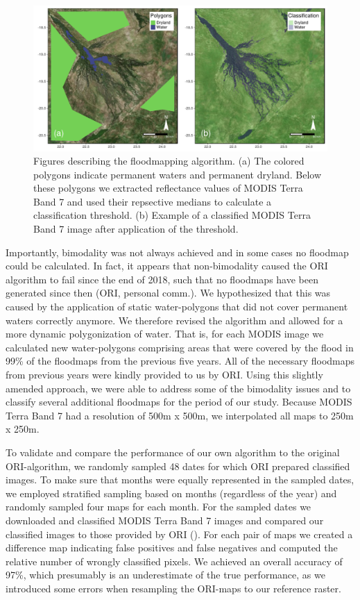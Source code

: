 \documentclass[abstract=on,10pt,a4paper,bibliography=totocnumbered]{scrartcl}
\begin{document}
\begin{figure}[h]
  \begin{center}
    \includegraphics[width = \textwidth]{99_Floodmapping.pdf}
    \caption{Figures describing the floodmapping algorithm. (a) The colored
    polygons indicate permanent waters and permanent dryland. Below these
    polygons we extracted reflectance values of MODIS Terra Band 7 and used
    their repsective medians to calculate a classification threshold. (b)
    Example of a classified MODIS Terra Band 7 image after application of the
    threshold.}
    \label{Floodmapping}
  \end{center}
\end{figure}

Importantly, bimodality was not always achieved and in some cases no floodmap
could be calculated. In fact, it appears that non-bimodality caused the ORI
algorithm to fail since the end of 2018, such that no floodmaps have been
generated since then (ORI, personal comm.). We hypothesized that this was caused
by the application of static water-polygons that did not cover permanent waters
correctly anymore. We therefore revised the algorithm and allowed for a more
dynamic polygonization of water. That is, for each MODIS image we calculated new
water-polygons comprising areas that were covered by the flood in 99\% of the
floodmaps from the previous five years. All of the necessary floodmaps from
previous years were kindly provided to us by ORI. Using this slightly amended
approach, we were able to address some of the bimodality issues and to classify
several additional floodmaps for the period of our study. Because MODIS Terra
Band 7 had a resolution of 500m x 500m, we interpolated all maps to 250m x 250m.

To validate and compare the performance of our own algorithm to the original
ORI-algorithm, we randomly sampled 48 dates for which ORI prepared classified
images. To make sure that months were equally represented in the sampled dates,
we employed stratified sampling based on months (regardless of the year) and
randomly sampled four maps for each month. For the sampled dates we downloaded
and classified MODIS Terra Band 7 images and compared our classified images to
those provided by ORI (). For each pair of maps we
created a difference map indicating false positives and false negatives and
computed the relative number of wrongly classified pixels. We achieved an
overall accuracy of 97\%, which presumably is an underestimate of the true
performance, as we introduced some errors when resampling the ORI-maps to our
reference raster.
\end{document}

